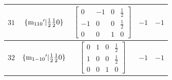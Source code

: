 \documentclass[fleqn,8pt]{jsarticle}
\begin{document}
\begin{longtable}{ccccc}
$ 31 $ & $ \{{\rm m}_{110}{}'|\frac{1}{2} \frac{1}{2} 0\} $ & $ \begin{bmatrix} 0 & -1 & 0 & \frac{1}{2} \\ -1 & 0 & 0 & \frac{1}{2} \\ 0 & 0 & 1 & 0 \end{bmatrix} $ & $ -1 $ & $ -1 $ \\ \hline
$ 32 $ & $ \{{\rm m}_{1-10}{}'|\frac{1}{2} \frac{1}{2} 0\} $ & $ \begin{bmatrix} 0 & 1 & 0 & \frac{1}{2} \\ 1 & 0 & 0 & \frac{1}{2} \\ 0 & 0 & 1 & 0 \end{bmatrix} $ & $ -1 $ & $ -1 $ \\
\end{longtable}
\end{document}

